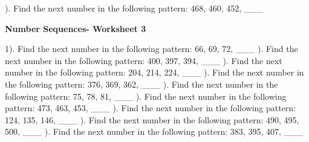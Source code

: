 \documentclass{article}%
\begin{document}
\newline%
\newline%
). Find the next number in the following pattern: 468, 460, 452, \_\_\_%
\newline%
\newline%
\newline%
\pagebreak%
\large%
\begin{center}%
\textbf{Number Sequences- Worksheet 3}%
\newline%
\end{center} \normalsize%
1). Find the next number in the following pattern: 66, 69, 72, \_\_\_%
\newline%
\newline%
). Find the next number in the following pattern: 400, 397, 394, \_\_\_%
\newline%
\newline%
). Find the next number in the following pattern: 204, 214, 224, \_\_\_%
\newline%
\newline%
). Find the next number in the following pattern: 376, 369, 362, \_\_\_%
\newline%
\newline%
). Find the next number in the following pattern: 75, 78, 81, \_\_\_%
\newline%
\newline%
). Find the next number in the following pattern: 473, 463, 453, \_\_\_%
\newline%
\newline%
). Find the next number in the following pattern: 124, 135, 146, \_\_\_%
\newline%
\newline%
). Find the next number in the following pattern: 490, 495, 500, \_\_\_%
\newline%
\newline%
). Find the next number in the following pattern: 383, 395, 407, \_\_\_%
\newline%
\newline%
\newline%
\end{document}
